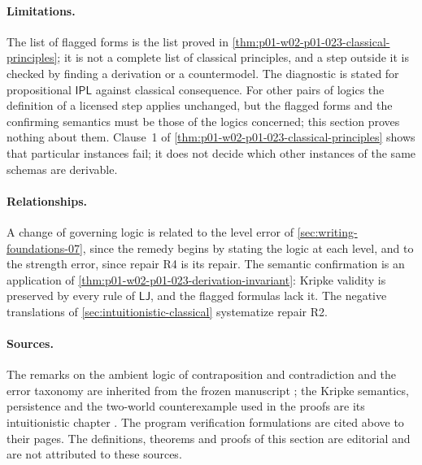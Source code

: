 \paragraph{Limitations.}
The list of flagged forms is the list proved in
\cref{thm:p01-w02-p01-023-classical-principles}; it is not a complete list of
classical principles, and a step outside it is checked by finding a
derivation or a countermodel. The diagnostic is stated for propositional
\(\mathsf{IPL}\) against classical consequence. For other pairs of logics
the definition of a licensed step applies unchanged, but the flagged forms
and the confirming semantics must be those of the logics concerned; this
section proves nothing about them. Clause~1 of
\cref{thm:p01-w02-p01-023-classical-principles} shows that particular
instances fail; it does not decide which other instances of the same schemas
are derivable.

\paragraph{Relationships.}
A change of governing logic is related to the level error of
\cref{sec:writing-foundations-07}, since the remedy begins by stating the
logic at each level, and to the strength error, since repair R4 is its
repair. The semantic confirmation is an application of
\cref{thm:p01-w02-p01-023-derivation-invariant}: Kripke validity is preserved
by every rule of \(\mathsf{LJ}\), and the flagged formulas lack it. The
negative translations of \cref{sec:intuitionistic-classical} systematize
repair R2.

\paragraph{Sources.}
The remarks on the ambient logic of contraposition and contradiction and the
error taxonomy are inherited from the frozen manuscript
\cite[lines 1505--1553, 1592--1631]{FrozenFormalLogicProofMethods}; the
Kripke semantics, persistence and the two-world counterexample used in the
proofs are its intuitionistic chapter
\cite[lines 12989--13127]{FrozenFormalLogicProofMethods}. The program
verification formulations are cited above to their pages. The definitions,
theorems and proofs of this section are editorial and are not attributed to
these sources.

